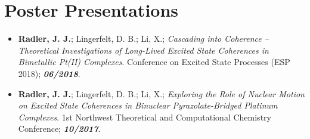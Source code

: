 \documentclass[letterpaper]{deedy-resume} %
\begin{document}
\begin{minipage}[t]{0.65\textwidth} %

%
%

\section{Poster Presentations}
\begin{itemize}
\item \textbf{Radler, J. J.}; Lingerfelt, D. B.; Li, X.; \emph{Cascading into Coherence -- Theoretical Investigations of Long-Lived Excited State Coherences in Bimetallic Pt(II) Complexes}. Conference on Excited State Processes (ESP 2018);	\textbf{\textit{06/2018}}.

\item \textbf{Radler, J. J.}; Lingerfelt, D. B.; Li, X.; \emph{Exploring the Role of Nuclear Motion on Excited State Coherences in Binuclear Pyrazolate-Bridged Platinum Complexes}. 1st Northwest Theoretical and Computational Chemistry Conference;	\textbf{\textit{10/2017}}.


\end{itemize}
\end{minipage}
\end{document}
